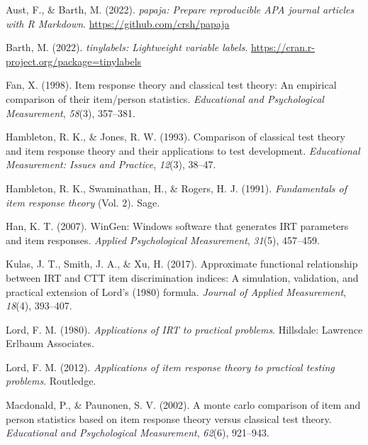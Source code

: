 \documentclass[
  man]{apa6}
\newlength{\cslhangindent}
\newlength{\cslentryspacingunit} %
\newenvironment{CSLReferences}[2] %
 {%
  \setlength{\parindent}{0pt}
  \ifodd #1
  \let\oldpar\par
  \def\par{\hangindent=\cslhangindent\oldpar}
  \fi
  \setlength{\parskip}{#2\cslentryspacingunit}
 }%
 {}
\begin{document}
\hypertarget{refs}{}
\begin{CSLReferences}{1}{0}
\leavevmode{}%
Aust, F., \& Barth, M. (2022). \emph{{papaja}: {Prepare} reproducible {APA} journal articles with {R Markdown}}. \url{https://github.com/crsh/papaja}

\leavevmode{}%
Barth, M. (2022). \emph{{tinylabels}: Lightweight variable labels}. \url{https://cran.r-project.org/package=tinylabels}

\leavevmode{}%
Fan, X. (1998). Item response theory and classical test theory: An empirical comparison of their item/person statistics. \emph{Educational and Psychological Measurement}, \emph{58}(3), 357--381.

\leavevmode{}%
Hambleton, R. K., \& Jones, R. W. (1993). Comparison of classical test theory and item response theory and their applications to test development. \emph{Educational Measurement: Issues and Practice}, \emph{12}(3), 38--47.

\leavevmode{}%
Hambleton, R. K., Swaminathan, H., \& Rogers, H. J. (1991). \emph{Fundamentals of item response theory} (Vol. 2). Sage.

\leavevmode{}%
Han, K. T. (2007). WinGen: Windows software that generates IRT parameters and item responses. \emph{Applied Psychological Measurement}, \emph{31}(5), 457--459.

\leavevmode{}%
Kulas, J. T., Smith, J. A., \& Xu, H. (2017). Approximate functional relationship between IRT and CTT item discrimination indices: A simulation, validation, and practical extension of {Lord's} (1980) formula. \emph{Journal of Applied Measurement}, \emph{18}(4), 393--407.

\leavevmode{}%
Lord, F. M. (1980). \emph{Applications of IRT to practical problems}. Hillsdale: Lawrence Erlbaum Associates.

\leavevmode{}%
Lord, F. M. (2012). \emph{Applications of item response theory to practical testing problems}. Routledge.

\leavevmode{}%
Macdonald, P., \& Paunonen, S. V. (2002). A monte carlo comparison of item and person statistics based on item response theory versus classical test theory. \emph{Educational and Psychological Measurement}, \emph{62}(6), 921--943.


\end{CSLReferences}
\end{document}
